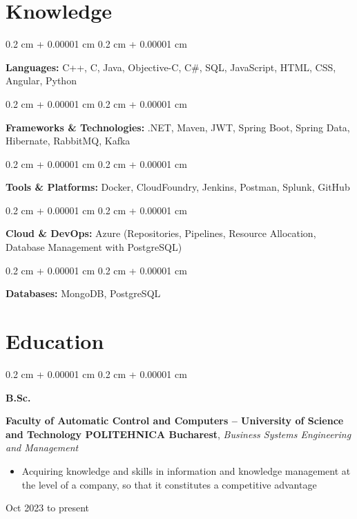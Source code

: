 \documentclass[10pt, letterpaper]{article}
\newenvironment{highlights}{
    \begin{itemize}[
        topsep=0.10 cm,
        parsep=0.10 cm,
        partopsep=0pt,
        itemsep=0pt,
        leftmargin=0.4 cm + 10pt
    ]
}{
    \end{itemize}
} %
\newenvironment{onecolentry}{
    \begin{adjustwidth}{
        0.2 cm + 0.00001 cm
    }{
        0.2 cm + 0.00001 cm
    }
}{
    \end{adjustwidth}
} %
\newenvironment{threecolentry}[3][]{
    \onecolentry
    \def\thirdColumn{#3}
    \setcolumnwidth{1 cm, \fill, 3.5 cm}
    \begin{paracol}{3}
    {\raggedright #2} \switchcolumn
}{
    \switchcolumn \raggedleft \thirdColumn
    \end{paracol}
    \endonecolentry
} %
\begin{document}
    
    \section{Knowledge}



        
        \begin{onecolentry}
            \textbf{Languages:} C++, C, Java, Objective-C, C\#, SQL, JavaScript, HTML, CSS, Angular, Python
        \end{onecolentry}

        \vspace{0.2 cm}

        \begin{onecolentry}
            \textbf{Frameworks \& Technologies:} .NET, Maven, JWT, Spring Boot, Spring Data, Hibernate, RabbitMQ, Kafka
        \end{onecolentry}

        \vspace{0.2 cm}

        \begin{onecolentry}
            \textbf{Tools \& Platforms:} Docker, CloudFoundry, Jenkins, Postman, Splunk, GitHub
        \end{onecolentry}

        \vspace{0.2 cm}

        \begin{onecolentry}
            \textbf{Cloud \& DevOps:} Azure (Repositories, Pipelines, Resource Allocation, Database Management with PostgreSQL)
        \end{onecolentry}

        \vspace{0.2 cm}

        \begin{onecolentry}
            \textbf{Databases:} MongoDB, PostgreSQL
        \end{onecolentry}


    
    \section{Education}



        
        \begin{threecolentry}{\textbf{B.Sc.}}{
            Oct 2023 to present
        }
            \textbf{Faculty of Automatic Control and Computers – University of Science and Technology POLITEHNICA Bucharest}, \textit{Business Systems Engineering and Management}
            \begin{highlights}
                \item Acquiring knowledge and skills in information and knowledge management at the level of a company, so that it constitutes a competitive advantage
            \end{highlights}
        \end{threecolentry}
\end{document}
